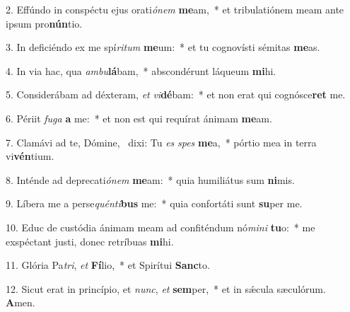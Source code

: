 2. Effúndo in conspéctu ejus orati\textit{ó}\textit{nem} \textbf{me}am,~*  et tribulatiónem meam ante ipsum pro\textbf{nún}tio.\

3. In deficiéndo ex me spí\textit{ri}\textit{tum} \textbf{me}um:~*  et tu cognovísti sémitas \textbf{me}as.\

4. In via hac, qua \textit{am}\textit{bu}\textbf{lá}bam,~*  abscondérunt láqueum \textbf{mi}hi.\

5. Considerábam ad déxteram, \textit{et} \textit{vi}\textbf{dé}bam:~*  et non erat qui cognósce\textbf{ret} me.\

6. Périit \textit{fu}\textit{ga} \textbf{a} me:~*  et non est qui requírat ánimam \textbf{me}am.\

7. Clamávi ad te, Dómine, \dag\  dixi: Tu \textit{es} \textit{spes} \textbf{me}a,~*  pórtio mea in terra vi\textbf{vén}tium.\

8. Inténde ad deprecati\textit{ó}\textit{nem} \textbf{me}am:~*  quia humiliátus sum \textbf{ni}mis.\

9. Líbera me a perse\textit{quén}\textit{ti}\textbf{bus} me:~*  quia confortáti sunt \textbf{su}per me.\

10. Educ de custódia ánimam meam ad confiténdum nó\textit{mi}\textit{ni} \textbf{tu}o:~*  me exspéctant justi, donec retríbuas \textbf{mi}hi.\

11. Glória Pa\textit{tri}, \textit{et} \textbf{Fí}lio,~*  et Spirítui \textbf{Sanc}to.\

12. Sicut erat in princípio, et \textit{nunc}, \textit{et} \textbf{sem}per,~*  et in sǽcula sæculórum. \textbf{A}men.\


